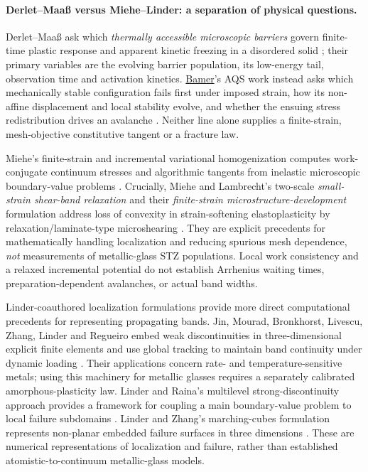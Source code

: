 \documentclass[11pt,a4paper]{article}
\begin{document}
\paragraph{Derlet--Maa\ss{} versus Miehe--Linder: a separation of physical questions.}
Derlet--Maa\ss{} ask which \emph{thermally accessible microscopic barriers} govern finite-time plastic response and apparent kinetic freezing in a disordered solid \cite{derlet2011,derlet2013,derlet2014}; their primary variables are the evolving barrier population, its low-energy tail, observation time and activation kinetics. \underline{Bamer}'s AQS work instead asks which mechanically stable configuration fails first under imposed strain, how its non-affine displacement and local stability evolve, and whether the ensuing stress redistribution drives an avalanche \cite{bamer2023}. Neither line alone supplies a finite-strain, mesh-objective constitutive tangent or a fracture law.

Miehe's finite-strain and incremental variational homogenization computes work-conjugate continuum stresses and algorithmic tangents from inelastic microscopic boundary-value problems \cite{miehe1999,miehe2002a,miehe2002b}. Crucially, Miehe and Lambrecht's two-scale \emph{small-strain shear-band relaxation} and their \emph{finite-strain microstructure-development} formulation address loss of convexity in strain-softening elastoplasticity by relaxation/laminate-type microshearing \cite{miehelambrecht2003,miehe2003band}. They are explicit precedents for mathematically handling localization and reducing spurious mesh dependence, \emph{not} measurements of metallic-glass STZ populations. Local work consistency and a relaxed incremental potential do not establish Arrhenius waiting times, preparation-dependent avalanches, or actual band widths.

Linder-coauthored localization formulations provide more direct computational precedents for representing propagating bands. Jin, Mourad, Bronkhorst, Livescu, Zhang, Linder and Regueiro embed weak discontinuities in three-dimensional explicit finite elements and use global tracking to maintain band continuity under dynamic loading \cite{jinlinder2019}. Their applications concern rate- and temperature-sensitive metals; using this machinery for metallic glasses requires a separately calibrated amorphous-plasticity law. Linder and Raina's multilevel strong-discontinuity approach provides a framework for coupling a main boundary-value problem to local failure subdomains \cite{linderraina2013}. Linder and Zhang's marching-cubes formulation represents non-planar embedded failure surfaces in three dimensions \cite{linderzhang2013}. These are numerical representations of localization and failure, rather than established atomistic-to-continuum metallic-glass models.
\end{document}
